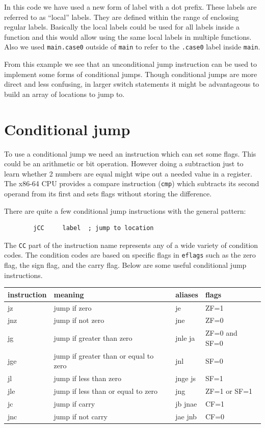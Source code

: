 \documentclass[11pt,b5paper]{book}
\begin{document}
In this code we have used a new form of label with a dot prefix.
These labels are referred to as ``local'' labels.
They are defined within the range of enclosing regular labels.
Basically the local labels could be used for all labels inside a function and
this would allow using the same local labels in multiple functions.
Also we used {\tt main.case0} outside of {\tt main} to refer to the {\tt .case0}
label inside {\tt main}.

From this example we see that an unconditional jump instruction can be used to implement some forms of conditional jumps.
Though conditional jumps are more direct and less confusing, in larger
switch statements it might be advantageous to build an array of locations to
jump to.


\section{Conditional jump}

To use a conditional jump we need an instruction which can set some flags. 
This could be an arithmetic or bit operation.
However doing a subtraction just to learn whether 2 numbers are equal might wipe out a needed value in a register.
The x86-64 CPU provides a compare instruction ({\tt cmp}) which subtracts its second operand from its first
and sets flags without storing the difference.

There are quite a few conditional jump instructions with the general pattern:
\begin{verbatim}
        jCC     label  ; jump to location 
\end{verbatim}
The {\tt CC} part of the instruction name represents any of a wide variety of condition codes.
The condition codes are based on specific flags in {\tt eflags} such as the zero flag, the sign flag,  
and the carry flag.
Below are some useful conditional jump instructions. 
\begin{center}
  \begin{tabular}{|l|l|l|l|}
    \hline
    instruction & meaning & aliases & flags \\
    \hline
    jz   & jump if zero & je & ZF=1 \\
    \hline
    jnz  & jump if not zero & jne & ZF=0 \\
    \hline
    jg   & jump if greater than zero & jnle ja & ZF=0 and SF=0 \\
    \hline
    jge  & jump if greater than or equal to zero & jnl & SF=0 \\
    \hline
    jl   & jump if less than zero & jnge js & SF=1 \\
    \hline
    jle  & jump if less than or equal to zero & jng & ZF=1 or SF=1 \\
    \hline
    jc   & jump if carry & jb jnae & CF=1 \\
    \hline
    jnc  & jump if not carry & jae jnb & CF=0 \\
    \hline
  \end{tabular}
\end{center}
\end{document}
